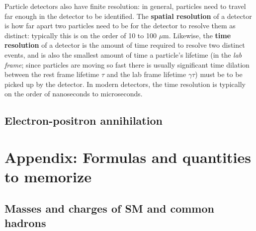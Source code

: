 \documentclass[11pt, oneside]{article}   	%
\theoremstyle{definition}
\numberwithin{equation}{subsection}		%
\begin{document}
Particle detectors also have finite resolution: in general, particles need to travel far enough in the detector to be identified. The 
\textbf{spatial resolution} of a detector is how far apart two particles need to be for the detector to resolve them as distinct: typically this 
is on the order of 10 to 100 $\mu$m. Likewise, the \textbf{time resolution} of a detector is the amount of time required to resolve two 
distinct events, and is also the smallest amount of time a particle's lifetime (in the \textit{lab frame}; since particles are moving so fast there 
is usually significant time dilation between the rest frame lifetime $\tau$ and the lab frame lifetime $\gamma\tau$) must be to be picked up by 
the detector. In modern detectors, the time resolution is typically on the order of nanoseconds to microseconds.


\subsection{Electron-positron annihilation}



\newpage
\section{Appendix: Formulas and quantities to memorize}

\subsection{Masses and charges of SM and common hadrons}
\end{document}
